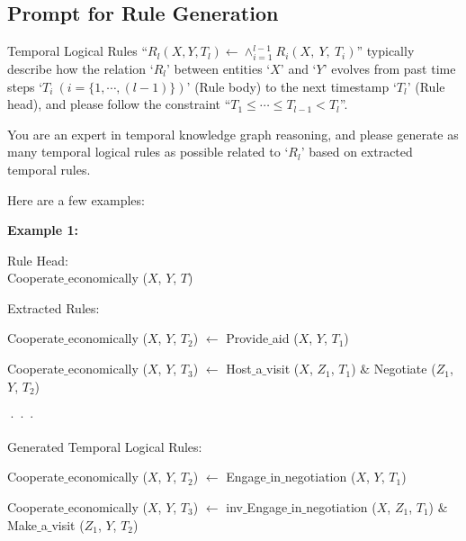 \documentclass{article}
\begin{document}
\subsection{Prompt for Rule Generation}\label{prompt}
\begin{tcolorbox}[colback=white!5!white, colframe=black!75!black, title=Prompt for Rule Generation]
\hspace*{0.5cm} Temporal Logical Rules ``$R_l(X, Y, T_l) \leftarrow \wedge_{i=1}^{l-1}R_i (X,\ Y,\ T_i)$'' typically describe how the relation `$R_l$' between entities `$X$' and `$Y$' evolves from past time steps `$T_i\ (i=\{1, \cdots ,(l-1)\})$' (Rule body) to the next timestamp `$T_l$' (Rule head), and please follow the constraint ``$T_1 \leq \cdots \leq T_{l-1} < T_l$''.

\bigskip
You are an expert in temporal knowledge graph reasoning, and please generate as many temporal logical rules as possible related to `$R_l$' based on extracted temporal rules.

\bigskip
Here are a few examples: 

\textbf{Example 1:}

\hspace*{0.5cm} Rule Head:\\ 
\hspace*{1cm} Cooperate$\_$economically ($X$, $Y$, $T$)

\hspace*{0.5cm} Extracted Rules:

\hspace*{1cm} Cooperate$\_$economically ($X$, $Y$, $T_2$) $\leftarrow$ Provide$\_$aid ($X$, $Y$, $T_1$)

\hspace*{1cm} Cooperate$\_$economically ($X$, $Y$, $T_3$) $\leftarrow$ Host$\_$a$\_$visit ($X$, $Z_1$, $T_1$) $\&$ Negotiate ($Z_1$, $Y$, $T_2$)

\hspace*{1cm} ···

\hspace*{0.5cm} Generated Temporal Logical Rules:

\hspace*{1cm} Cooperate$\_$economically ($X$, $Y$, $T_2$) $\leftarrow$ Engage$\_$in$\_$negotiation ($X$, $Y$, $T_1$)

\hspace*{1cm} Cooperate$\_$economically ($X$, $Y$, $T_3$) $\leftarrow$ inv$\_$Engage$\_$in$\_$negotiation ($X$, $Z_1$, $T_1$) $\&$ Make$\_$a$\_$visit ($Z_1$, $Y$, $T_2$)


\end{tcolorbox}
\end{document}
